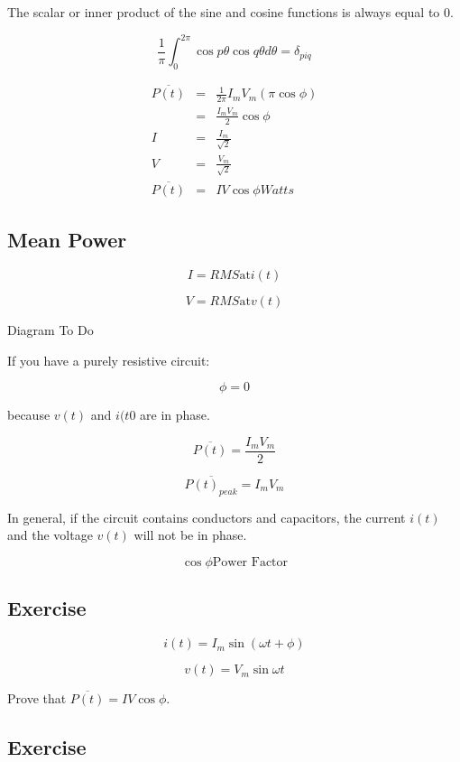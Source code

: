 \documentclass[a4paper,12pt]{article}
\begin{document}
The scalar or inner product of the sine and cosine functions
is always equal to $0$.

\[ \frac{1}{\pi} \int^{2 \pi}_{0} \cos{p \theta}\cos{q \theta} d\theta =
\delta_{piq} \]

\begin{eqnarray*}
\overline{P(t)} & = & \frac{1}{2 \pi} I_{m} V_{m} (\pi \cos{\phi}) \\
                & = & \frac{I_{m} V_{m}}{2} \cos{\phi} \\
I               & = & \frac{I_{m}}{\sqrt{2}} \\
V               & = & \frac{V_{m}}{\sqrt{2}} \\
\overline{P(t)} & = & IV \cos{\phi} Watts
\end{eqnarray*}

\subsection{Mean Power}

\[ I = RMS \mbox{at} i(t) \]

\[ V = RMS \mbox{at} v(t) \]

\begin{table}[hbtp]

Diagram To Do

\end{table}

If you have a purely resistive circuit:

\[ \phi = 0 \]

because $v(t)$ and $i(t0$ are in phase.

\[ \overline{P(t)} = \frac{I_{m} V_{m}}{2} \]

\[ \overline{P(t)_{peak}} = I_{m} V_{m} \]

In general, if the circuit contains conductors and capacitors,
the current $i(t)$ and the voltage $v(t)$ will not be in phase.

\[ \cos{\phi} \mbox{Power Factor} \]

\subsection{Exercise}

\[ i(t) = I_{m} \sin{(\omega t + \phi)} \]

\[ v(t) = V_{m} \sin{\omega t} \]

Prove that $\overline{P(t)} = IV\cos{\phi}$.

\subsection{Exercise}
\end{document}
